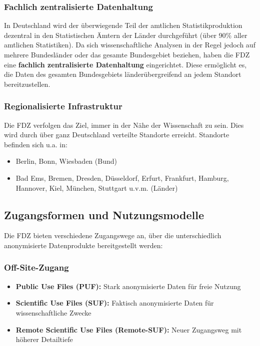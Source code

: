 \documentclass[
  ngerman,
  10pt,
  twocolumn]{article}
\providecommand{\tightlist}{%
  \setlength{\itemsep}{0pt}\setlength{\parskip}{0pt}}
\begin{document}
\subsubsection{Fachlich zentralisierte
Datenhaltung}\label{fachlich-zentralisierte-datenhaltung}

In Deutschland wird der überwiegende Teil der amtlichen
Statistikproduktion dezentral in den Statistischen Ämtern der Länder
durchgeführt (über 90\% aller amtlichen Statistiken). Da sich
wissenschaftliche Analysen in der Regel jedoch auf mehrere Bundesländer
oder das gesamte Bundesgebiet beziehen, haben die FDZ eine
\textbf{fachlich zentralisierte Datenhaltung} eingerichtet. Diese
ermöglicht es, die Daten des gesamten Bundesgebiets länderübergreifend
an jedem Standort bereitzustellen.

\subsubsection{Regionalisierte
Infrastruktur}\label{regionalisierte-infrastruktur}

Die FDZ verfolgen das Ziel, immer in der Nähe der Wissenschaft zu sein.
Dies wird durch über ganz Deutschland verteilte Standorte erreicht.
Standorte befinden sich u.a. in:

\begin{itemize}
\tightlist
\item
  Berlin, Bonn, Wiesbaden (Bund)
\item
  Bad Ems, Bremen, Dresden, Düsseldorf, Erfurt, Frankfurt, Hamburg,
  Hannover, Kiel, München, Stuttgart u.v.m. (Länder)
\end{itemize}

\subsection{Zugangsformen und
Nutzungsmodelle}\label{zugangsformen-und-nutzungsmodelle}

Die FDZ bieten verschiedene Zugangswege an, über die unterschiedlich
anonymisierte Datenprodukte bereitgestellt werden:

\subsubsection{Off-Site-Zugang}\label{off-site-zugang}

\begin{itemize}
\tightlist
\item
  \textbf{Public Use Files (PUF):} Stark anonymisierte Daten für freie
  Nutzung
\item
  \textbf{Scientific Use Files (SUF):} Faktisch anonymisierte Daten für
  wissenschaftliche Zwecke
\item
  \textbf{Remote Scientific Use Files (Remote-SUF):} Neuer Zugangsweg
  mit höherer Detailtiefe
\end{itemize}
\end{document}
